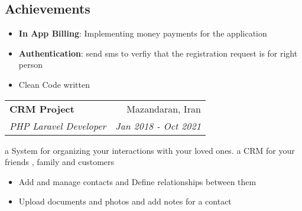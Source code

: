 \documentclass[A4,11pt]{article}
\makeatletter
\newcommand{\resumeItem}[2]{
  \item{
    \textbf{#1}{: #2 \vspace{-2pt}}
  }
}
\newcommand{\resumeProjectItem}[1]{
  \item{
    { #1 \vspace{-2pt}}
  }
}
\newcommand{\resumeSubheading}[4]{
  \vspace{-1pt}\item
    \begin{tabular*}{0.97\textwidth}[t]{l@{\extracolsep{\fill}}r}
      \textbf{#1} & #2 \\
      \textit{#3} & \textit{\small #4} \\
    \end{tabular*}\vspace{-5pt}
}
\newcommand{\resumeSubSubheading}[2]{
    \begin{tabular*}{0.97\textwidth}{l@{\extracolsep{\fill}}r}
      \textit{#1} & \textit{\small #2} \\
    \end{tabular*}\vspace{-5pt}
}
\newcommand{\resumeSubHeadingListEnd}{\end{itemize}}
\newcommand{\resumeItemListStart}{\begin{itemize}}
\newcommand{\resumeItemListEnd}{\end{itemize}\vspace{-5pt}}
\makeatother
\begin{document}
     \vspace{-10pt}

	\subsection*{Achievements}
	\vspace{-10pt}
	\resumeItemListStart
        \resumeItem{In App Billing}{ Implementing money payments for the application }
	\resumeItem{Authentication}{send sms to verfiy that the registration request is for right person}
     \resumeProjectItem{Clean Code written}
      \resumeItemListEnd
      
    
     \vspace{5pt}
 
    \resumeSubheading
      {CRM Project}{Mazandaran, Iran}
      {PHP Laravel Developer}{Jan 2018 - Oct 2021}
      
     \vspace{10pt}

	{a System for organizing your interactions with your loved ones. a CRM for your friends , family and customers  }

      
      \resumeItemListStart
        \resumeProjectItem
          {Add and manage contacts and Define relationships between them}
        \resumeProjectItem
          {Upload documents and photos and add notes for a contact}

      \resumeItemListEnd

       \vspace{-10pt}
      
\end{document}
